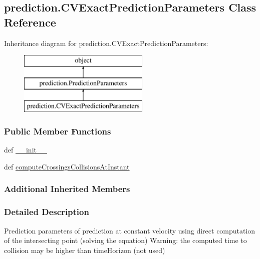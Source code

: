 \hypertarget{classprediction_1_1CVExactPredictionParameters}{\subsection{prediction.\-C\-V\-Exact\-Prediction\-Parameters Class Reference}
\label{classprediction_1_1CVExactPredictionParameters}
}
Inheritance diagram for prediction.\-C\-V\-Exact\-Prediction\-Parameters\-:\begin{figure}[H]
\begin{center}
\leavevmode
\includegraphics[height=3.000000cm]{classprediction_1_1CVExactPredictionParameters}
\end{center}
\end{figure}
\subsubsection*{Public Member Functions}
\begin{DoxyCompactItemize}
\item 
def \hyperlink{classprediction_1_1CVExactPredictionParameters_a5dcd0f68b0f3d183de4df10331594d9d}{\-\_\-\-\_\-init\-\_\-\-\_\-}
\item 
def \hyperlink{classprediction_1_1CVExactPredictionParameters_a28a2b07587dd6c5e6996948b04c7141c}{compute\-Crossings\-Collisions\-At\-Instant}
\end{DoxyCompactItemize}
\subsubsection*{Additional Inherited Members}


\subsubsection{Detailed Description}
\begin{DoxyVerb}Prediction parameters of prediction at constant velocity
using direct computation of the intersecting point (solving the equation)
Warning: the computed time to collision may be higher than timeHorizon (not used)\end{DoxyVerb}
 

